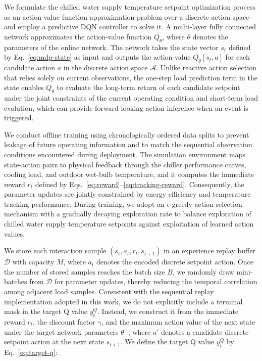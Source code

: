 \documentclass[preprint,12pt]{elsarticle}
\begin{document}
We formulate the chilled water supply temperature setpoint optimization process as an action-value function approximation problem over a discrete action space and employ a predictive DQN controller to solve it. A multi-layer fully connected network approximates the action-value function \(Q_{\theta}\), where \(\theta\) denotes the parameters of the online network. The network takes the state vector \(s_t\) defined by Eq.~\eqref{eq:mdp-state} as input and outputs the action value \(Q_{\theta}[s_t,a]\) for each candidate action \(a\) in the discrete action space \(\mathcal{A}\). Unlike reactive action selection that relies solely on current observations, the one-step load prediction term in the state enables \(Q_{\theta}\) to evaluate the long-term return of each candidate setpoint under the joint constraints of the current operating condition and short-term load evolution, which can provide forward-looking action inference when an event is triggered.

We conduct offline training using chronologically ordered data splits to prevent leakage of future operating information and to match the sequential observation conditions encountered during deployment. The simulation environment maps state-action pairs to physical feedback through the chiller performance curves, cooling load, and outdoor wet-bulb temperature, and it computes the immediate reward \(r_t\) defined by Eqs.~\eqref{eq:reward}--\eqref{eq:tracking-reward}. Consequently, the parameter updates are jointly constrained by energy efficiency and temperature tracking performance. During training, we adopt an \(\epsilon\)-greedy action selection mechanism with a gradually decaying exploration rate to balance exploration of chilled water supply temperature setpoints against exploitation of learned action values.

We store each interaction sample \((s_t,a_t,r_t,s_{t+1})\) in an experience replay buffer \(\mathcal{D}\) with capacity \(M\), where \(a_t\) denotes the encoded discrete setpoint action. Once the number of stored samples reaches the batch size \(B\), we randomly draw mini-batches from \(\mathcal{D}\) for parameter updates, thereby reducing the temporal correlation among adjacent load samples. Consistent with the sequential replay implementation adopted in this work, we do not explicitly include a terminal mask in the target Q value \(y_t^{Q}\). Instead, we construct it from the immediate reward \(r_t\), the discount factor \(\gamma\), and the maximum action value of the next state under the target network parameters \(\theta^{-}\), where \(a'\) denotes a candidate discrete setpoint action at the next state \(s_{t+1}\). We define the target Q value \(y_t^{Q}\) by Eq.~\eqref{eq:target-q}:
\end{document}
